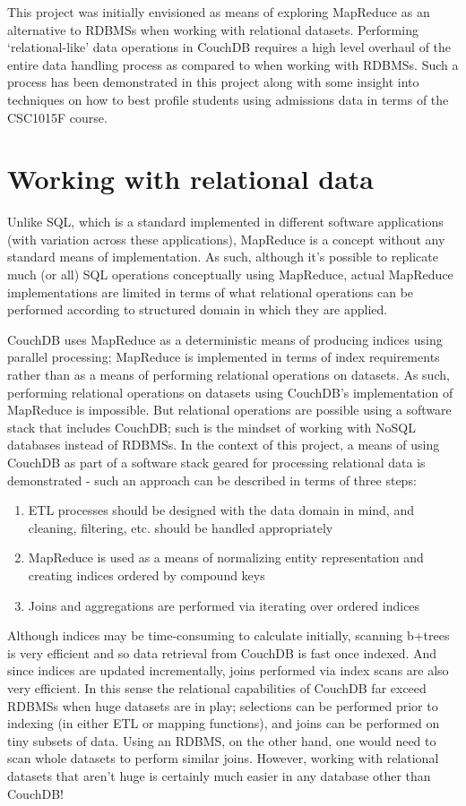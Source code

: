This project was initially envisioned as means of exploring MapReduce as an alternative to RDBMSs when working with relational datasets. Performing `relational-like' data operations in CouchDB requires a high level overhaul of the entire data handling process as compared to when working with RDBMSs. Such a process has been demonstrated in this project along with some insight into techniques on how to best profile students using admissions data in terms of the CSC1015F course.

\section{Working with relational data}
Unlike SQL, which is a standard implemented in different software applications (with variation across these applications), MapReduce is a concept without any standard means of implementation. As such, although it's possible to replicate much (or all) SQL operations conceptually using MapReduce, actual MapReduce implementations are limited in terms of what relational operations can be performed according to structured domain in which they are applied.

CouchDB uses MapReduce as a deterministic means of producing indices using parallel processing; MapReduce is implemented in terms of index requirements rather than as a means of performing relational operations on datasets. As such, performing relational operations on datasets using CouchDB's implementation of MapReduce is impossible. But relational operations are possible using a software stack that includes CouchDB; such is the mindset of working with NoSQL databases instead of RDBMSs. In the context of this project, a means of using CouchDB as part of a software stack geared for processing relational data is demonstrated - such an approach can be described in terms of three steps:

\begin{enumerate}
    \item ETL processes should be designed with the data domain in mind, and cleaning, filtering, etc. should be handled appropriately
    \item MapReduce is used as a means of normalizing entity representation and creating indices ordered by compound keys
    \item Joins and aggregations are performed via iterating over ordered indices
\end{enumerate}

Although indices may be time-consuming to calculate initially, scanning b+trees is very efficient and so data retrieval from CouchDB is fast once indexed. And since indices are updated incrementally, joins performed via index scans are also very efficient. In this sense the relational capabilities of CouchDB far exceed RDBMSs when huge datasets are in play; selections can be performed prior to indexing (in either ETL or mapping functions), and joins can be performed on tiny subsets of data. Using an RDBMS, on the other hand, one would need to scan whole datasets to perform similar joins. However, working with relational datasets that aren't huge is certainly much easier in any database other than CouchDB!